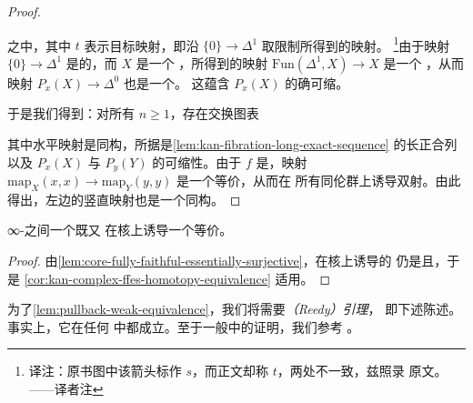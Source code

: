 \begin{proof}
\begin{center}
\end{center}
之中，其中 $t$ 表示目标映射，即沿 $\{0\} \to \Delta^1$ 取限制所得到的映射。
\footnote{译注：原书图中该箭头标作 $s$，而正文却称 $t$，两处不一致，兹照录
原文。——译者注}由于映射 $\{0\} \to \Delta^1$ 是\trAnodyne{}的，而 $X$ 是一个%
\trKanComplex{}，所得到的映射 $\mathrm{Fun}(\Delta^1, X) \to X$ 是一个%
\trTrivialFibration{}，从而映射 $P_x(X) \to \Delta^0$ 也是一个\trTrivialFibration{}。
这蕴含 $P_x(X)$ 的确可缩。

于是我们得到：对所有 $n \ge 1$，存在交换图表
\begin{center}
\end{center}
其中水平映射是同构，所据是\cref{lem:kan-fibration-long-exact-sequence} 的长正合列
以及 $P_x(X)$ 与 $P_y(Y)$ 的可缩性。由于 $f$ 是\trFullyFaithful{}，映射
$\mathrm{map}_X(x, x) \to \mathrm{map}_Y(y, y)$ 是一个\trHomotopy{}等价，从而在
所有同伦群上诱导双射。由此得出，左边的竖直映射也是一个同构。
\end{proof}

\begin{corollary}\label{cor:ffes-groupoid-core}
∞-\trCategories{}之间一个既\trFullyFaithful{}又\trEssentiallySurjective{}%
\trFunctor{}在\trGroupoid{}核上诱导一个\trHomotopy{}等价。
\end{corollary}

\begin{proof}
由\cref{lem:core-fully-faithful-essentially-surjective}，在\trGroupoid{}核上诱导的%
\trFunctor{}仍是\trEssentiallySurjective{}且\trFullyFaithful{}，于是
\cref{cor:kan-complex-ffes-homotopy-equivalence} 适用。
\end{proof}

为了\cref{lem:pullback-weak-equivalence}，我们将需要\emph{\trReedy{}（Reedy）引理}，
即下述陈述。事实上，它在任何%
\trModelCategory{}中都成立。至于一般\trModelCategory{}中的证明，我们参考
\cite[Prop.~13.1.2]{Hir03}。

